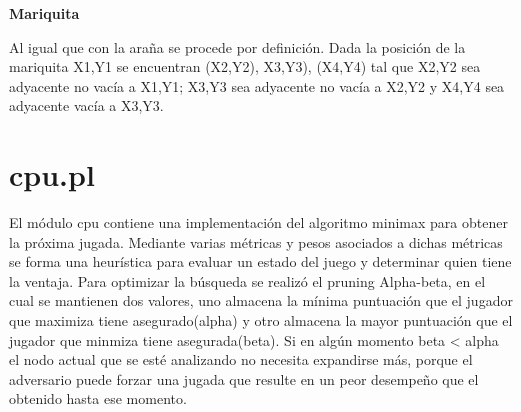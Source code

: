 \documentclass[12pt,letterpaper]{article}
\begin{document}
	\begin{flushleft}
		\textbf{Mariquita}
	\end{flushleft}
	Al igual que con la ara\~na se procede por definici\'on. Dada la posici\'on de la mariquita X1,Y1 se encuentran (X2,Y2), X3,Y3), (X4,Y4) tal que X2,Y2 sea adyacente no vac\'ia a X1,Y1; X3,Y3 sea adyacente no vac\'ia a  X2,Y2 y X4,Y4 sea adyacente vac\'ia a X3,Y3.
	
	\section*{cpu.pl}
	El m\'odulo cpu contiene una implementaci\'on del algoritmo minimax para obtener la pr\'oxima jugada. Mediante varias m\'etricas y pesos asociados a dichas m\'etricas se forma una heur\'istica para evaluar un estado del juego y determinar quien tiene la ventaja. Para optimizar la b\'usqueda se realiz\'o el pruning Alpha-beta, en el cual se mantienen dos valores, uno almacena la m\'inima puntuaci\'on que el jugador que maximiza tiene asegurado(alpha) y otro almacena la mayor puntuaci\'on que el jugador que minmiza tiene asegurada(beta). Si en alg\'un momento beta < alpha el nodo actual que se est\'e analizando no necesita expandirse m\'as, porque el adversario puede forzar una jugada que resulte en un peor desempe\~no que el obtenido hasta ese momento.
\end{document}

